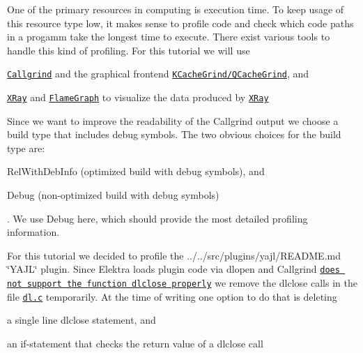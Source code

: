 One of the primary resources in computing is execution time. To keep usage of this resource type low, it makes sense to profile code and check which code paths in a progamm take the longest time to execute. There exist various tools to handle this kind of profiling. For this tutorial we will use


\begin{DoxyEnumerate}
\item \href{http://valgrind.org/docs/manual/cl-manual.html}{\tt Callgrind} and the graphical frontend \href{https://kcachegrind.github.io/html/Home.html}{\tt K\+Cache\+Grind/\+Q\+Cache\+Grind}, and
\item \href{https://llvm.org/docs/XRay.html}{\tt X\+Ray} and \href{https://github.com/brendangregg/FlameGraph}{\tt Flame\+Graph} to visualize the data produced by \href{https://llvm.org/docs/XRay.html}{\tt X\+Ray}
\end{DoxyEnumerate}

Since we want to improve the readability of the Callgrind output we choose a build type that includes debug symbols. The two obvious choices for the build type are\+:


\begin{DoxyItemize}
\item {\ttfamily Rel\+With\+Deb\+Info} (optimized build with debug symbols), and
\item {\ttfamily Debug} (non-\/optimized build with debug symbols)
\end{DoxyItemize}

. We use {\ttfamily Debug} here, which should provide the most detailed profiling information.

For this tutorial we decided to profile the ../../src/plugins/yajl/\+R\+E\+A\+D\+ME.md \char`\"{}\+Y\+A\+J\+L\char`\"{} plugin. Since Elektra loads plugin code via {\ttfamily dlopen} and Callgrind \href{https://stackoverflow.com/questions/16719395}{\tt does not support the function {\ttfamily dlclose} properly} we remove the {\ttfamily dlclose} calls in the file \href{/home/jenkins/workspace/libelektra-release/src/libs/loader/dl.c}{\tt {\ttfamily dl.\+c}} temporarily. At the time of writing one option to do that is deleting


\begin{DoxyItemize}
\item a single line {\ttfamily dlclose} statement, and
\item an {\ttfamily if}-\/statement that checks the return value of a {\ttfamily dlclose} call
\end{DoxyItemize}

